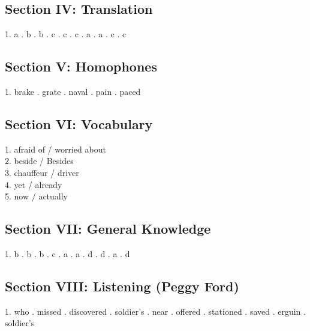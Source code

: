 \documentclass[11pt,a4paper]{article}
\begin{document}
\subsection{Section IV: Translation}
1. a . b . b . c . c . c . a . a . c . c

\subsection{Section V: Homophones}
1. brake . grate . naval . pain . paced

\subsection{Section VI: Vocabulary}
1. afraid of / worried about \\
2. beside / Besides \\
3. chauffeur / driver \\
4. yet / already \\
5. now / actually

\subsection{Section VII: General Knowledge}
1. b . b . b . c . a . a . d . d . a . d

\subsection{Section VIII: Listening (Peggy Ford)}
1. who . missed . discovered . soldier's . near . offered . stationed . saved . erguin . soldier's
\end{document}
